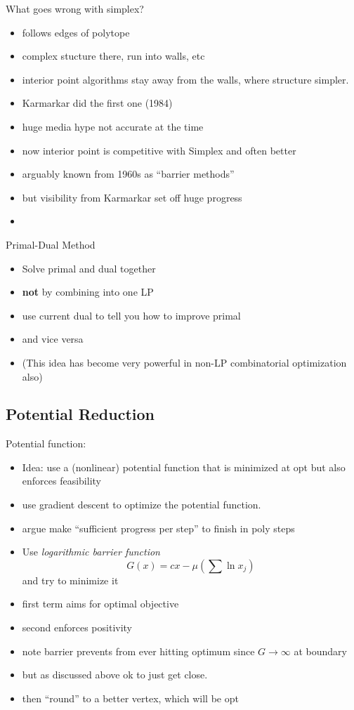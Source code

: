 \documentclass{article}
\begin{document}
What goes wrong with simplex?
\begin{itemize}
\item follows edges of polytope
\item complex stucture there, run into walls, etc
\item interior point algorithms stay away from the walls, where
 structure simpler.
\item Karmarkar did the first one (1984)
\item huge media hype not accurate at the time
\item now interior point is competitive with Simplex and often better
\item arguably known from 1960s as ``barrier methods''
\item but visibility from Karmarkar set off huge progress
\item 
\end{itemize}

Primal-Dual Method
\begin{itemize}
\item Solve primal and dual together
\item \textbf{not} by combining into one LP
\item use current dual to tell you how to improve primal
\item and vice versa
\item (This idea has become very powerful in non-LP combinatorial
 optimization also)
\end{itemize}

\subsection{Potential Reduction}

Potential function:
\begin{itemize}
\item Idea: use a (nonlinear) potential function that is minimized at
 opt but also enforces feasibility
\item use gradient descent to optimize the potential function.
\item argue make ``sufficient progress per step'' to finish in poly steps
\item Use {\em logarithmic barrier function}
\[
G(x) = cx-\mu(\sum\ln x_j)
\]
and try to minimize it
\item first term aims for optimal objective
\item second enforces positivity
\item note barrier prevents from ever hitting optimum since $G
 \rightarrow \infty$ at boundary
\item but as discussed above ok to just get close.
\item then ``round'' to a better vertex, which will be opt
\end{itemize}
\end{document}
